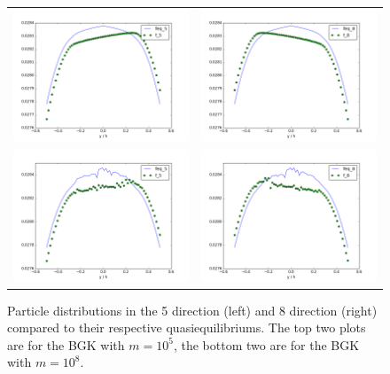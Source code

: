 \documentclass[pdftex,ms]{pittetd}
\begin{document}
\begin{figure}
\centering
\begin{tabulary}{\linewidth}{c c}
\includegraphics[width=2.1in]{figs/poise-bingham/bgk-5/feq-vs-f_5.png}
&
\includegraphics[width=2.1in]{figs/poise-bingham/bgk-5/feq-vs-f_8.png}
\\
\includegraphics[width=2.1in]{figs/poise-bingham/bgk-8/feq-vs-f_5.png}
&
\includegraphics[width=2.1in]{figs/poise-bingham/bgk-8/feq-vs-f_8.png}
\end{tabulary}
\caption{Particle distributions in the 5 direction (left) and 8 direction (right) compared to their respective quasiequilibriums. The top two plots are for the BGK with $m = 10^5$, the bottom two are for the BGK with $m = 10^8$.}
\label{fig:feq-vs-f_bgk}
\end{figure}
\end{document}
